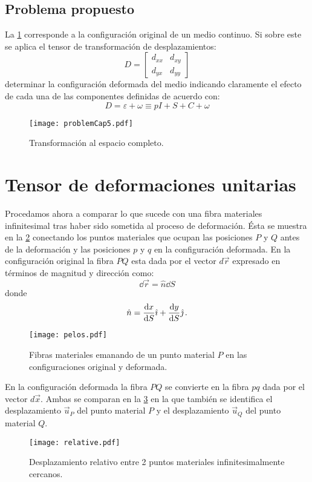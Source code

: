 \documentclass[../notas medios.tex]{subfiles}
\begin{document}
\subsection*{Problema propuesto}

La \cref{problem} corresponde a la configuración original de un medio continuo. Si sobre este se aplica el tensor de transformación de desplazamientos:
\[D = \begin{bmatrix}
d_{xx} &d_{xy}\\
d_{yx} &d_{yy}
\end{bmatrix}\]
determinar la configuración deformada del medio indicando claramente el efecto 
de cada una de las componentes definidas de acuerdo con:
\[D = \varepsilon  + \omega  \equiv pI + S + C + \omega \]
\begin{figure}[H]
\centering
	\texttt{[image: problemCap5.pdf]}
	\caption{Transformación al espacio completo.}
	\label{problem}
\end{figure}


\section{Tensor de deformaciones unitarias}
Procedamos ahora a comparar lo que sucede con una fibra materiales 
infinitesimal tras haber sido sometida al proceso de deformación. Ésta se 
muestra en la \cref{pelos} conectando los puntos materiales que ocupan las 
posiciones $P$ y $Q$ antes de la deformación y las posiciones $p$ y $q$ en la 
configuración deformada. En la configuración original la fibra $PQ$ esta dada 
por el vector $d\vec{r}$ expresado en términos de magnitud y dirección como:
\[\dd{\vec r} = \hat n\dd{S}\]
donde
\[\hat n = \dv{x}{S}\hat \imath + \dv{y}{S}\hat \jmath\, .\]

\begin{figure}[H]
\centering
	\texttt{[image: pelos.pdf]}
	\caption{Fibras materiales emanando de un punto material $P$ en las configuraciones original y deformada.}
	\label{pelos}
\end{figure}

En la configuración deformada la fibra $PQ$ se convierte en la fibra $pq$ dada 
por el vector $d\vec{x}$. Ambas se comparan en la \cref{relative} en la que 
también se identifica el desplazamiento $\vec{u}_P$ del punto material $P$ y el 
desplazamiento $\vec{u}_Q$  del punto material $Q$.

\begin{figure}[H]
\centering
	\texttt{[image: relative.pdf]}
	\caption{Desplazamiento relativo entre 2 puntos materiales infinitesimalmente cercanos.}
	\label{relative}
\end{figure}
\end{document}

